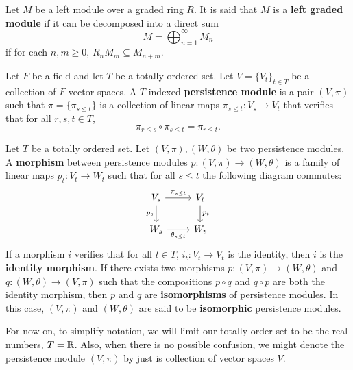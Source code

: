 \begin{definition}
    Let $M$ be a left module over a graded ring $ R $. It is said that $ M $ is a {\bf left graded module} if it can be decomposed into a direct sum
    $$
        M = \bigoplus_{n=1}^{\infty} M_n
    $$
    if for each $n, m \geq 0 $, $ R_n M_m \subseteq M_{n+m} $.
\end{definition}

\begin{definition}
    Let $F$ be a field and let $T$ be a totally ordered set. Let $ V = \{V_t\}_{t \in T} $ be a collection of $F$-vector spaces. A $T$-indexed {\bf persistence module} is a pair $ (V, \pi) $ such that $ \pi = \{ \pi_{s \leq t} \} $ is a collection of linear maps $ \pi_{s \leq t}\colon V_s \rightarrow V_t $ that verifies that for all $ r, s, t \in T $,
    $$
        \pi_{r \leq s} \circ \pi_{s \leq t} = \pi_{r \leq t}.
    $$
\end{definition}

\begin{definition}
    Let $T$ be a totally ordered set. Let $ (V, \pi), (W, \theta) $ be two persistence modules. A {\bf morphism} between persistence modules $ p \colon (V, \pi) \to (W, \theta) $ is a family of linear maps $ p_t \colon V_t \to W_t $ such that for all $ s \leq t $ the following diagram commutes:
    $$
    \begin{tikzcd}
        V_s \arrow[r, "\pi_{s \leq t}"] \arrow[d, "p_s"'] & V_t \arrow[d, "p_t"] \\
        W_s \arrow[r, "\theta_{s \leq t}"']               & W_t
    \end{tikzcd}
    $$
    If a morphism $ i $ verifies that for all $ t \in T $, $ i_t \colon V_t \to V_t $ is the identity, then $ i $ is the {\bf identity morphism}. If there exists two morphisms $ p \colon (V, \pi) \to (W, \theta) $ and $ q \colon (W, \theta) \to (V, \pi) $ such that the compositions $ p \circ q $ and $ q \circ p $ are both the identity morphism, then $ p $ and $ q $ are {\bf isomorphisms} of persistence modules. In this case, $ (V, \pi) $ and $ (W, \theta) $ are said to be {\bf isomorphic} persistence modules.
\end{definition}

For now on, to simplify notation, we will limit our totally order set to be the real numbers, $ T = \mathbb R $. Also, when there is no possible confusion, we might denote the persistence module $ (V, \pi) $ by just is collection of vector spaces $ V $.

